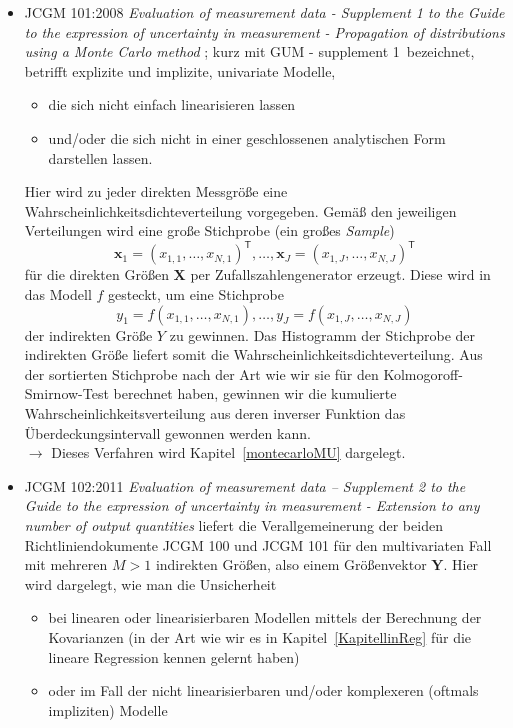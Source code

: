 \begin{itemize}
\item JCGM 101:2008 \textsl{Evaluation of measurement
data - Supplement 1 to the Guide to the expression of
uncertainty in measurement - Propagation of distributions using a Monte Carlo method} \cite{GUMS1};
kurz mit \glqq GUM - supplement 1\grqq ~bezeichnet, betrifft
explizite und implizite, univariate Modelle,
  \begin{itemize}
  \item die sich nicht einfach linearisieren lassen
  \item und/oder die sich nicht in einer geschlossenen analytischen Form darstellen lassen.
  \end{itemize}
Hier wird zu jeder direkten Messgröße eine Wahrscheinlichkeitsdichteverteilung vorgegeben.
Gemäß den jeweiligen Verteilungen wird eine große Stichprobe (ein großes \textsl{Sample})
$$
\mathbf{x}_1 = (x_{1,1},\dots,x_{N,1})^\mathsf{T}, \dots, \mathbf{x}_J = (x_{1,J},\dots,x_{N,J})^\mathsf{T}
$$
für die direkten Größen $\mathbf{X}$ per Zufallszahlengenerator erzeugt. Diese wird in das Modell $f$ gesteckt,
um eine Stichprobe
\begin{equation}
y_1 = f(x_{1,1},\dots,x_{N,1}), \dots, y_J = f(x_{1,J},\dots,x_{N,J})
\end{equation}
der indirekten Größe $Y$ zu gewinnen. Das Histogramm der Stichprobe der indirekten Größe liefert somit die
Wahrscheinlichkeitsdichteverteilung. Aus der sortierten Stichprobe nach der Art wie wir sie
für den Kolmogoroff-Smirnow-Test berechnet haben, gewinnen wir die kumulierte Wahrscheinlichkeitsverteilung
aus deren inverser Funktion das Überdeckungsintervall gewonnen werden kann.\\
$\rightarrow$ Dieses Verfahren wird Kapitel~\ref{montecarloMU} dargelegt.
\item JCGM 102:2011 \textsl{Evaluation of measurement data – Supplement 2 to the
Guide to the expression of uncertainty in measurement - Extension to any number of output quantities}
liefert die Verallgemeinerung der beiden Richtliniendokumente JCGM 100 und JCGM 101 für den multivariaten
Fall mit mehreren $M>1$ indirekten Größen, also einem Größenvektor $\mathbf{Y}$.
Hier wird dargelegt, wie man die Unsicherheit
  \begin{itemize}
  \item bei linearen oder linearisierbaren Modellen
    mittels der Berechnung der Kovarianzen (in der Art wie wir es
    in Kapitel~\ref{KapitellinReg} für die lineare Regression kennen gelernt haben)
  \item oder im Fall der nicht linearisierbaren und/oder komplexeren (oftmals impliziten) Modelle

\end{itemize}
\end{itemize}
